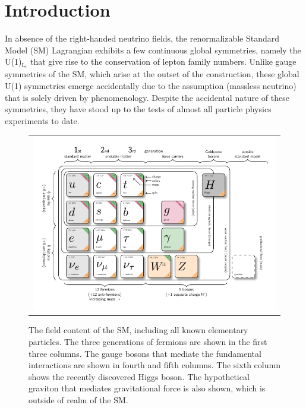 \chapter{Introduction}
\label{chap:Introduction}

In absence of the right-handed neutrino fields, the renormalizable Standard Model (SM) Lagrangian exhibits a few continuous global symmetries, namely the U(1)$_{\text{L}_{i}}$ that give rise to the conservation of lepton family numbers. Unlike gauge symmetries of the SM, which arise at the outset of the construction, these global U(1) symmetries emerge accidentally due to the assumption (massless neutrino) that is solely driven by phenomenology. Despite the accidental nature of these symmetries, they have stood up to the tests of almost all particle physics experiments to date.  

\begin{figure}[tbh!]
 \begin{center}
 \begin{tabular}{c}
 \includegraphics[width=\textwidth]{figures/SM}
 \end{tabular}
 \caption{The field content of the \ac{SM}, including all known elementary particles. The three generations of fermions are shown in the first three columns. The gauge bosons that mediate the fundamental interactions are shown in fourth and fifth columns. The sixth column shows the recently discovered Higgs boson. The hypothetical graviton that mediates gravitational force is also shown, which is outside of realm of the \ac{SM}.~\cite{tikz:SM}}
 \label{fig:5fold}
 \end{center}
\end{figure}


